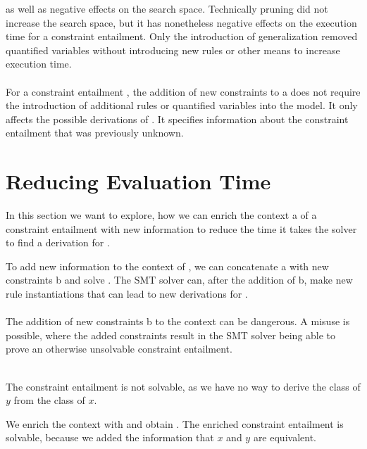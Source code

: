 as well as negative effects on the search space.
Technically pruning did not increase the search space,
but it has nonetheless negative effects on the execution time
for a constraint entailment.
Only the introduction of generalization removed quantified variables
without introducing new rules or other means to increase execution time.\\
\\
For a constraint entailment ,
the addition of new constraints to \ovl a
does not require the introduction of
additional rules or quantified variables into the model.
It only affects the possible derivations of .
It specifies information about the constraint entailment
that was previously unknown.
\newpage

\section{Reducing Evaluation Time} %
In this section we want to explore,
how we can enrich the context \ovl a
of a constraint entailment 
with new information to reduce
the time it takes the solver to find a derivation for .

To add new information to the context of ,
we can concatenate \ovl a with new constraints \ovl b
and solve .
The SMT solver can, after the addition of \ovl b,
make new rule instantiations that
can lead to new derivations for .\\
\\
The addition of new constraints \ovl b to the context
can be dangerous.
A misuse is possible, where the added constraints
result in the SMT solver being able to
prove an otherwise unsolvable constraint entailment.

\begin{example}
\label{ex:enrich-context-misuse}\quad\\
The constraint entailment 
is not solvable,
as we have no way to derive the class of $y$ from the class of $x$.

We enrich the context with  and obtain
.
The enriched constraint entailment is solvable,
because we added the information that $x$ and $y$ are equivalent.
\end{example}

